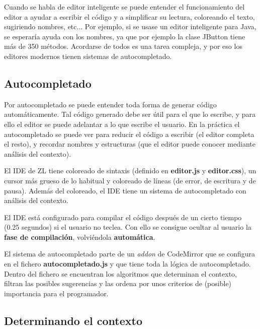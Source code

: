 \documentclass{report}
\begin{document}
	Cuando se habla de editor inteligente se puede entender el funcionamiento del editor a ayudar a escribir el código y a simplificar su lectura, coloreando el texto, sugiriendo nombres, etc... Por ejemplo, si se usase un editor inteligente para Java, se esperaría ayuda con los nombres, ya que por ejemplo la clase JButton tiene más de 350 métodos. Acordarse de todos es una tarea compleja, y por eso los editores modernos tienen sistemas de autocompletado. 
	
	\vspace{10px}
	
	\subsection{Autocompletado}
	
	Por autocompletado se puede entender toda forma de generar código automáticamente. Tal código generado debe ser útil para el que lo escribe, y para ello el editor se puede adelantar a lo que escribe el usuario. En la práctica el autocompletado se puede ver para reducir el código a escribir (el editor completa el resto), y recordar nombres y estructuras (que el editor puede conocer mediante análisis del contexto).
	
	\vspace{10px}
	
	El IDE de ZL tiene coloreado de sintaxis (definido en \textbf{editor.js} y \textbf{editor.css}), un cursor más grueso de lo habitual y coloreado de líneas (de error, de escritura y de pausa). Además del coloreado, el IDE tiene un sistema de autocompletado con análisis del contexto.
	
	\vspace{10px}
	
	El IDE está configurado para compilar el código después de un cierto tiempo (0.25 segundos) si el usuario no teclea. Con ello se consigue ocultar al usuario la \textbf{fase de compilación}, volviéndola \textbf{automática}. 
	
	\vspace{10px}
	
	El sistema de autocompletado parte de un \textit{addon} de CodeMirror que se configura en el fichero \textbf{autocompletado.js} y que tiene toda la lógica de autocompletado. Dentro del fichero se encuentran los algoritmos que determinan el contexto, filtran las posibles sugerencias y las ordena por unos criterios de (posible) importancia para el programador.
	
	\subsection{Determinando el contexto}
	
\end{document}
